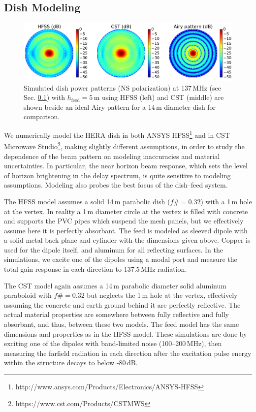 \documentclass{emulateapj}
\begin{document}
\subsection{Dish Modeling}
\label{sec:dishmodels}

\begin{figure}
\centering
\includegraphics[width=7in]{dave197_rich195_airy_beams.pdf}
\caption{Simulated dish power patterns (NS polarization) at 137\,MHz (see Sec. \ref{sec:dishmodels}) with $h_\text{feed}=5$\,m using HFSS (left) and CST (middle) are shown beside an ideal Airy pattern for a 14\,m diameter dish for comparison.}
\label{fig:modelbeams}
\end{figure}

We numerically model the HERA dish in both ANSYS HFSS\footnote{http://www.ansys.com/Products/Electronics/ANSYS-HFSS} and in CST Microwave Studio\footnote{https://www.cst.com/Products/CSTMWS}, making slightly different assumptions, in order to study the dependence of the beam pattern on modeling inaccuracies and material uncertainties. In particular, the near horizon beam response, which sets the level of horizon brightening in the delay spectrum, is quite sensitive to modeling assumptions. Modeling also probes the best focus of the dish--feed system. 

The HFSS model assumes a solid 14\,m parabolic dish ($f\#=0.32$) with a 1\,m hole at the vertex. In reality a 1\,m diameter circle at the vertex is filled with concrete and supports the PVC pipes which suspend the mesh panels, but we effectively assume here it is perfectly absorbant.  The feed is modeled as sleeved dipole with a solid metal back plane and cylinder with the dimensions given above. Copper is used for the dipole itself, and aluminum for all reflecting surfaces. In the simulations, we excite one of the dipoles using a modal port and measure the total gain response in each direction to 137.5\,MHz radiation. 

The CST model again assumes a 14\,m parabolic diameter solid aluminum paraboloid with $f\#=0.32$ but neglects the 1\,m hole at the vertex, effectively assuming the concrete and earth ground behind it are perfectly reflective. The actual material properties are somewhere between fully reflective and fully absorbant, and thus, between these two models. The feed model has the same dimensions and properties as in the HFSS model. These simulations are done by exciting one of the dipoles with band-limited noise (100--200\,MHz), then measuring the farfield radiation in each direction after the excitation pulse energy within the structure decays to below -80\,dB. 
\end{document}
